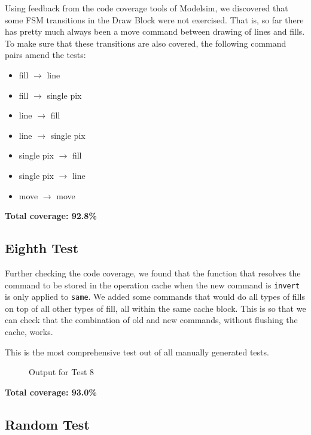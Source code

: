 \documentclass[]{article}
\begin{document}
Using feedback from the code coverage tools of Modelsim, we discovered that some FSM transitions in the Draw Block were not exercised. That is, so far there has pretty much always been a move command between drawing of lines and fills. To make sure that these transitions are also covered, the following command pairs amend the tests:
\begin{itemize}
	\item fill $\rightarrow$ line
	\item fill $\rightarrow$ single pix
	\item line $\rightarrow$ fill
	\item line $\rightarrow$ single pix
	\item single pix $\rightarrow$ fill
	\item single pix $\rightarrow$ line
	\item move $\rightarrow$ move
\end{itemize}

\textbf{Total coverage: 92.8\%}


\subsection{Eighth Test} %
\label{sub:eighth_test}

Further checking the code coverage, we found that the function that resolves the command to be stored in the operation cache when the new command is \verb"invert" is only applied to \verb"same".
We added some commands that would do all types of fills on top of all other types of fill, all within the same cache block. This is so that we can check that the combination of old and new commands, without flushing the cache, works.

This is the most comprehensive test out of all manually generated tests.

\begin{figure}[htbp]
	\begin{center}
		
	\end{center}
	\caption{Output for Test 8}
	\label{fig:output_for_test_8}
\end{figure}

\textbf{Total coverage: 93.0\%}


\subsection{Random Test} %
\label{sub:random_test}
\end{document}
